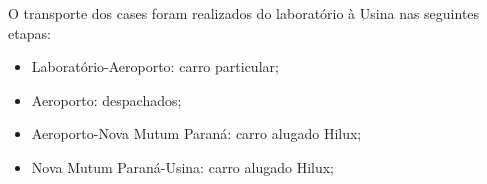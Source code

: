 O transporte dos cases foram realizados do laboratório à Usina nas
seguintes etapas:
\begin{itemize}
  \item Laboratório-Aeroporto: carro particular;
  \item Aeroporto: despachados;
  \item Aeroporto-Nova Mutum Paraná: carro alugado Hilux;
  \item Nova Mutum Paraná-Usina: carro alugado Hilux;
\end{itemize} 

 

\label{metodos}



